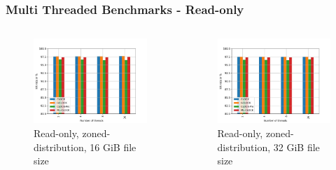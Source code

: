 \documentclass[
	aspectratio=169,
	compress,
]{beamer}
\newcommand{\navframetitle}[1]{\frametitle{#1\hfill{\footnotesize\lastsection{}}}}
\begin{document}
\begin{frame}[fragile]
	\navframetitle{Multi Threaded Benchmarks - Read-only}

	\begin{columns}
		\begin{column}{0.5\textwidth}
			\begin{figure}[ht]
    			\centering
    			\includegraphics[width=\textwidth]{multi_16_gb_randread_zoned.jpg}
        		\caption{Read-only, zoned-distribution, 16 GiB file size}
			\end{figure}
		\end{column}
		\begin{column}{0.5\textwidth}
			\begin{figure}[ht]
    			\centering
    			\includegraphics[width=\textwidth]{multi_32_gb_randread_zoned.jpg}
        		\caption{Read-only, zoned-distribution, 32 GiB file size}
			\end{figure}			
		\end{column}
	\end{columns}
\end{frame}
\end{document}
